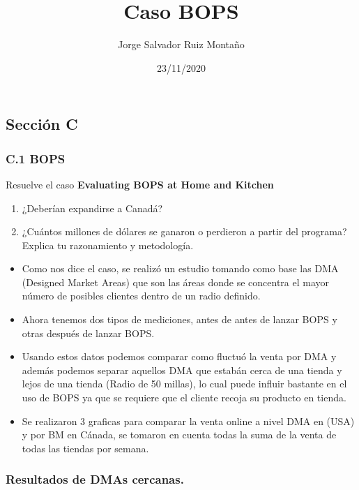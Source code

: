 \documentclass[
  landscape]{article}
\title{Caso BOPS}
\author{Jorge Salvador Ruiz Montaño}
\date{23/11/2020}
\providecommand{\tightlist}{%
  \setlength{\itemsep}{0pt}\setlength{\parskip}{0pt}}
\begin{document}
\maketitle

\hypertarget{secciuxf3n-c}{%
\subsection{Sección C}\label{secciuxf3n-c}}

\hypertarget{c.1-bops}{%
\subsubsection{C.1 BOPS}\label{c.1-bops}}

Resuelve el caso \textbf{Evaluating BOPS at Home and Kitchen}

\begin{enumerate}
\def\labelenumi{\arabic{enumi}.}
\item
  ¿Deberían expandirse a Canadá?
\item
  ¿Cuántos millones de dólares se ganaron o perdieron a partir del
  programa? Explica tu razonamiento y metodología.
\end{enumerate}

\begin{itemize}
\tightlist
\item
  Como nos dice el caso, se realizó un estudio tomando como base las DMA
  (Designed Market Areas) que son las áreas donde se concentra el mayor
  número de posibles clientes dentro de un radio definido.
\item
  Ahora tenemos dos tipos de mediciones, antes de antes de lanzar BOPS y
  otras después de lanzar BOPS.
\item
  Usando estos datos podemos comparar como fluctuó la venta por DMA y
  además podemos separar aquellos DMA que estabán cerca de una tienda y
  lejos de una tienda (Radio de 50 millas), lo cual puede influir
  bastante en el uso de BOPS ya que se requiere que el cliente recoja su
  producto en tienda.
\item
  Se realizaron 3 graficas para comparar la venta online a nivel DMA en
  (USA) y por BM en Cánada, se tomaron en cuenta todas la suma de la
  venta de todas las tiendas por semana.
\end{itemize}

\newpage

\hypertarget{resultados-de-dmas-cercanas.}{%
\subsubsection{Resultados de DMAs
cercanas.}\label{resultados-de-dmas-cercanas.}}
\end{document}
